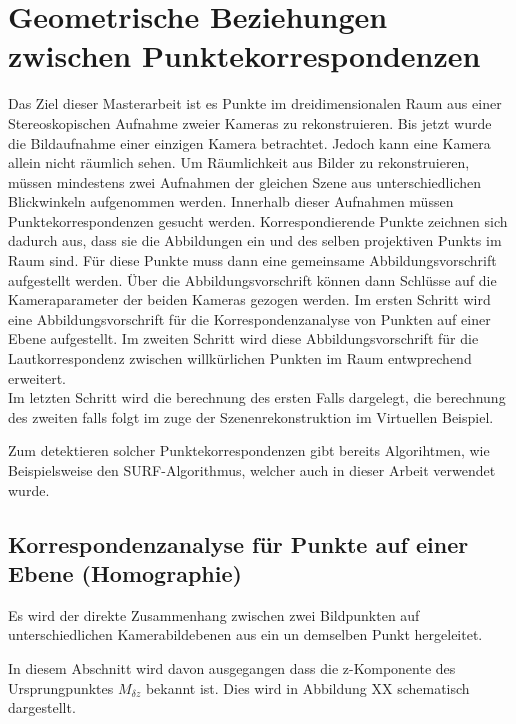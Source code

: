 \chapter{Geometrische Beziehungen zwischen Punktekorrespondenzen}
\label{sec:HFE}

Das Ziel dieser Masterarbeit ist es Punkte im dreidimensionalen Raum aus einer Stereoskopischen Aufnahme zweier Kameras zu rekonstruieren. Bis jetzt wurde die Bildaufnahme einer einzigen Kamera betrachtet. Jedoch kann eine Kamera allein nicht räumlich sehen. Um Räumlichkeit aus Bilder zu rekonstruieren, müssen mindestens zwei Aufnahmen der gleichen Szene aus unterschiedlichen Blickwinkeln aufgenommen werden. Innerhalb dieser Aufnahmen müssen Punktekorrespondenzen gesucht werden. Korrespondierende Punkte zeichnen sich dadurch aus, dass sie die Abbildungen ein und des selben projektiven Punkts im Raum sind. Für diese Punkte muss dann eine gemeinsame Abbildungsvorschrift aufgestellt werden. Über die Abbildungsvorschrift können dann Schlüsse auf die Kameraparameter der beiden Kameras gezogen werden. Im ersten Schritt wird eine Abbildungsvorschrift für die Korrespondenzanalyse von Punkten auf einer Ebene aufgestellt. Im zweiten Schritt wird diese Abbildungsvorschrift für die Lautkorrespondenz zwischen willkürlichen Punkten im Raum entwprechend erweitert. \\


Im letzten Schritt wird die berechnung des ersten Falls dargelegt, die berechnung des zweiten falls folgt im zuge der Szenenrekonstruktion im Virtuellen Beispiel.


Zum detektieren solcher Punktekorrespondenzen gibt bereits Algorihtmen, wie Beispielsweise den SURF-Algorithmus\cite{SURF}, welcher auch in dieser Arbeit verwendet wurde.  

 
 \section{Korrespondenzanalyse für Punkte auf einer Ebene (Homographie)}
 
 Es wird der direkte Zusammenhang zwischen zwei Bildpunkten auf unterschiedlichen Kamerabildebenen aus ein un demselben Punkt hergeleitet. 

 
  In diesem Abschnitt wird davon ausgegangen dass die z-Komponente des Ursprungpunktes $M_{\delta z}$ bekannt ist. Dies wird in Abbildung XX schematisch dargestellt.
 

